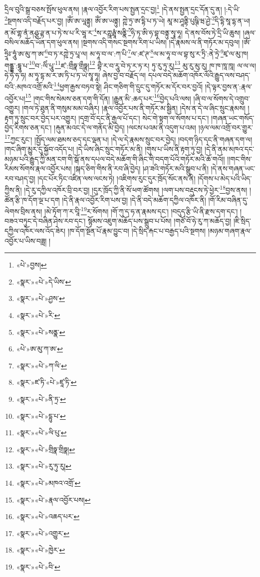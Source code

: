 དྲིལ་བུའི་སྒྲ་བཅས་སྤོས་ཕུལ་ནས། །རྣལ་འབྱོར་རིག་པས་སྤྱན་དྲང་བྱ།\footnote{«པེ་»བྱས།} །དེ་ནས་སྤྱན་དྲང་དོན་དུ་ན། །:དེ་ཡི་\footnote{«སྣར་»«པེ་»དེ་ཡིས་}སྔགས་འདི་བརྗོད་པར་བྱ། །ཨོཾ་ཨ་ཡཱནྟུ། ཨོཾ་ཨ་ཡནྟུ། ཀྵེ་ཏྲ་ཨ་དྷི་པ་ཏ་ཡེ། མཱ་མ་ཤཱནྟི་པུཥྚི་ཝ་ཤྱེ་\footnote{«སྣར་»«པེ་»ཤྱས་}དི་དྷི་སཱ་དྷ་ན་ཡ། ན་མོ་གྷ་ནཾ་ནཤྩ་ཌྷ་ན་པ་ཏེ་ས་པ་རི་ཝཱ་ར་\footnote{«སྣར་»«པེ་»རི་}ས་རཀྵཱརྠཱཾ་སནྣི་\footnote{«སྣར་»«པེ་»སནྣ་}ཧི་ཏ་ཨི་ཧ་བྷ་བནྟུ་སྭཱ་ཧཱ། དེ་ནས་བོས་ཏེ་དྲི་ཡི་ཆུས། །ཞལ་བསིལ་མཆོད་ཡོན་དག་ཕུལ་ནས། །སྔགས་འདི་གསང་སྔགས་རིག་པ་ཡིས། །དེ་རྣམས་ལ་ནི་གཏོར་མ་དབུལ། །ཨོཾ་ཧྲཱིཿ་ཧཱུཾ་ཨ་མུ་ཀ་ཨ་\footnote{«པེ་»ཨ་མུ་ཀ་ཨ་}བ་ཏ་རཀྵེ་ཏྲ་པཱ་ལ། མ་ཧཱ་བ་ལ་:ཀ་པི་\footnote{«སྣར་»«པེ་»ཀ་ལི་}ལ་:ཛ་ཊ་\footnote{«སྣར་»ཛ་ཏི་«པེ་»ཛཱ་ཏི་}ལ་མ་ཧཱ་བ་ལ་བྷ་སུ་ར་ཏྲི་:ནེ་ཏྲེ་\footnote{«སྣར་»«པེ་»ནི་ཏྲ་}ཛྭ་ལ་མུ་ཁ། གནྡྷ་:དྷཱུ་པ་\footnote{«སྣར་»«པེ་»དྷུ་པ་}བ་:ལིཾ་པཱུ་\footnote{«སྣར་»«པེ་»ལི་པུ་}ཛ་:གྲྀཧྣ་གྲྀཧྣ།\footnote{«སྣར་»«པེ་»གྲིཧྣ་གྲིཧྣ།} བྷཻ་ར་བ་རཱུ་བེ་ཏ་ར་ཏ་ར། ཏུ་རུ་ཏུ་རུ།\footnote{«སྣར་»«པེ་»རུ་ཏུ་རུ།} མུ་རུ་མུ་རུ། ཁ་ཁ་ཁཱ་ཁཱ། ལ་ལ་ལ། ཧེ་ཧེ་ཧ་ཧ། མ་ཧཱ་དྷ་མ་ར་ཨ་ཏི་པ་ཏ་ཡེ་སྭཱ་ཧཱ། ཞེས་བྱ་བ་བརྗོད་ལ། དཔལ་བདེ་མཆོག་འཁོར་ལོའི་རྒྱུད་ལས་བཤད་བའི་:མཁའ་འགྲོ་མའི་\footnote{«སྣར་»«པེ་»མཁའ་འགྲོ་}ཕྱག་རྒྱས་བཏབ་སྟེ། ཤིང་གཅིག་གི་དྲུང་དུ་གཏོར་མ་དོར་བར་བྱའོ། །དེ་ལྟར་བྱས་ན་:རྣལ་འབྱོར་པ།\footnote{«སྣར་»«པེ་»རྣལ་འབྱོར་པས།} །གང་གིས་སེམས་ཅན་དག་གི་དོན། །རྒྱུན་མི་:ཆད་པར་\footnote{«སྣར་»«པེ་»འཆད་པར་}བྱེད་པའི་ལས། །ཞི་བ་ལ་སོགས་དེ་འགྲུབ་འགྱུར། །གལ་ཏེ་ཐུན་ནི་གསུམ་མམ་བཞིར། །རྣལ་འབྱོར་པས་ནི་གཏོར་མ་སྦྱིན། །དེས་ན་དེ་ལ་ཞིང་སྲུང་རྣམས། །རྟག་ཏུ་སྲུང་བར་བྱེད་པར་འགྱུར། །དགྲ་བོ་དང་ནི་རྒྱལ་པོ་དང་། སེང་གེ་སྟག་ལ་སོགས་པ་དང་། །གཞན་ཡང་གསོད་བྱེད་རིགས་ཅན་དང་། །རྐུན་མའང་དེ་ལ་གནོད་མི་བྱེད། །ལངས་པའམ་ནི་འདུག་པ་འམ། །ཉལ་ལམ་འགྲོ་བར་གྱུར་\footnote{«སྣར་»«པེ་»འགྱུར་}ཀྱང་རུང་། །སྤྱོད་ལམ་ཐམས་ཅད་དང་ལྡན་པ། །དེ་ལ་དེ་རྣམས་སྲུང་བར་བྱེད། །བདག་ཉིད་དང་ནི་གཞན་དག་ལ། །གང་ཞིག་མྱུར་དུ་སྐྱོབ་འདོད་པ། །དེ་ཡིས་ཞིང་སྲུང་གཏོར་མ་ནི། །གུས་པ་ཡིས་ནི་རྟག་ཏུ་བྱ། །དེ་ནི་ནམ་མཁའ་དང་མཉམ་པའི་རྒྱུད་ཀྱི་མན་ངག་གི་སྒོ་ནས་དཔལ་བདེ་མཆོག་གི་ཞིང་གི་བདག་པོའི་གཏོར་མའི་ཆོ་གའོ།། །།གང་གིས་རིམས་སོགས་རྣལ་འབྱོར་པས། །སྐད་ཅིག་གིས་ནི་རབ་ཞི་བྱེད། །ཤ་ཟའི་གཏོར་མའི་སྒྲུབ་པ་ནི། །དེ་ནས་གཞན་ཡང་རབ་བཤད་བྱ། །དང་པོར་ཏིང་འཛིན་ལས་ལངས་ཏེ། །འཇིགས་རུང་དུར་ཁྲོད་སོང་ནས་ནི། །དོགས་པ་མེད་པའི་ཡིད་ཀྱིས་ནི། །དེ་རུ་དཀྱིལ་འཁོར་བྲི་བར་བྱ། །དུར་ཁྲོད་ཀྱི་ནི་སོ་ཕག་ཚོགས། །ལག་པས་བརྡུངས་ཏེ་ཕྱེར་\footnote{«སྣར་»«པེ་»ཁྱེར་}བྱས་ནས། །ཚོན་རྩི་ཁ་དོག་ལྔ་པ་དག །དེ་ནི་རྣལ་འབྱོར་རིག་པས་བྱ། །དེ་ནི་བདེ་མཆོག་དཀྱིལ་འཁོར་ནི། །གོ་རིམ་བཞིན་དུ་ལེགས་བྲིས་ནས། །མེ་ཏོག་ཀ་ར་བཱི་\footnote{«སྣར་»«པེ་»བི་}ར་སོགས། །གོ་ཀུ་ད་ཧ་ན་རྣམས་དང་། །བདུད་རྩི་ཡི་ནི་རྫས་དག་དང་། །བཟའ་བཏུང་དེ་བཞིན་ཤེས་རབ་དང་། སྙོམས་འཇུག་མཆོད་པས་སྒྲུབ་པ་པོས། །གཙོ་བོ་ཧེ་རུ་ཀ་མཆོད་བྱ། །ཇི་སྲིད་དཀྱིལ་འཁོར་ལས་འོད་ཟེར། །ཁ་དོག་སྔོན་པོ་རྣམ་བྱུང་བ། །དེ་སྲིད་རྐང་པ་བརྒྱད་པའི་སྔགས། །མཉམ་གཞག་རྣལ་འབྱོར་པ་ཡིས་བཟླ། །
